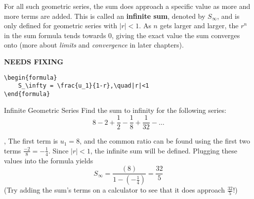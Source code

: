 \documentclass[../../main.tex]{subfiles}
\begin{document}
For all such geometric series, the sum does approach a specific value as more and more terms are added. This is called an \textbf{infinite sum}, denoted by \(S_\infty\), and is only defined for geometric series with \(|r|<1\). As \(n\) gets larger and larger, the \(r^n\) in the sum formula tends towards 0, giving the exact value the sum converges onto (more about \emph{limits} and \emph{convergence} in later chapters).

{\hfill\Large\bfseries NEEDS FIXING\hfill}
\begin{lstlisting}
\begin{formula}
    S_\infty = \frac{u_1}{1-r},\quad|r|<1
\end{formula}
 \end{lstlisting}

\begin{example}{Infinite Geometric Series}
Find the sum to infinity for the following series:
\[
    8 - 2 + \frac12 - \frac18 + \frac1{32} - \ldots
\]

\sep
The first term is \(u_1 = 8\), and the common ratio can be found using the first two terms \(\frac{-2}8 = -\frac14\). Since \(|r|<1\), the infinite sum will be defined. Plugging these values into the formula yields
\[
    S_\infty = \frac{(8)}{1-(-\frac14)} = \frac{32}{5}
\]
(Try adding the sum's terms on a calculator to see that it does approach $\frac{32}{5}$!)
\end{example}
\end{document}
